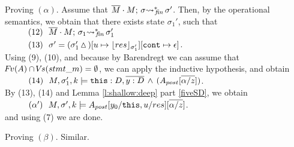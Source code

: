 {\begin{description}
 \vspace{.1cm}
Proving $(\alpha)$. Assume that   $\leadstoBoundedStarFin  {\Mtwo\cdot M}  {\sigma}  {\sigma'}$. Then, by the operational semantics, we obtain that 
there exists state $\sigma_1'$, such that \\
$\SPS (12) \ \ \leadstoBoundedStarFin  {\Mtwo\cdot M}  {\sigma_1}  {\sigma_1'}$ \\
$\SPS (13) \ \ \sigma'=(\sigma_1'\popSymbol)[u \mapsto {\interpret {\sigma_1'} {res}}][\prg{cont}\mapsto \epsilon]$.
\\
Using (9), (10), and because by Barendregt we can assume that $\fv(A)\cap \vs(stmt\_m) = \emptyset$, we can apply the inductive hypothesis, and obtain\\
$\SPS (14) \ \  \satDAssertFrom M  {\sigma_1'} {k}   {\prg{this}:D,\overline{y:D}\, \wedge\, (A_{post}[\overline{\alpha/z}])}$.
\\
By (13), (14) and Lemma  \ref{l:shallow:deep} part \ref{fiveSD}, we obtain\\
$\SPS (\alpha') \ \  \satDAssertFrom M  {\sigma'} {k}   {A_{post}[y_0/ \prg{this},u/res][\overline{\alpha/z}]}$.\\
and using (7) we are done.

 \vspace{.1cm}
Proving $(\beta)$. Similar.


\end{description}}
